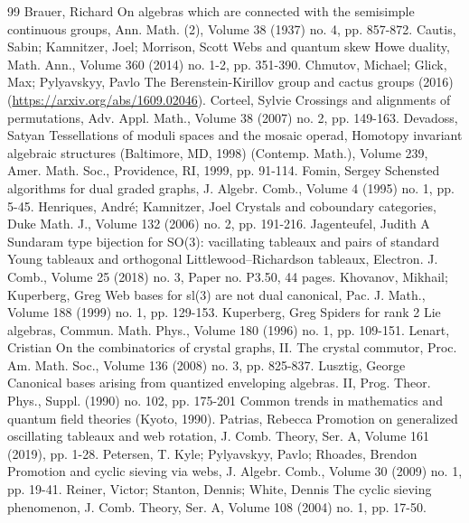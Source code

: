 \begin{thebibliography}{99}
 Brauer, Richard On algebras which are connected with the semisimple continuous groups, Ann. Math. (2), Volume 38 (1937) no. 4, pp. 857-872.
 Cautis, Sabin; Kamnitzer, Joel; Morrison, Scott Webs and quantum skew Howe duality, Math. Ann., Volume 360 (2014) no. 1-2, pp. 351-390.
 Chmutov, Michael; Glick, Max; Pylyavskyy, Pavlo The Berenstein-Kirillov group and cactus groups (2016) (\url{https://arxiv.org/abs/1609.02046}).
 Corteel, Sylvie Crossings and alignments of permutations, Adv. Appl. Math., Volume 38 (2007) no. 2, pp. 149-163.
 Devadoss, Satyan Tessellations of moduli spaces and the mosaic operad, Homotopy invariant algebraic structures (Baltimore, MD, 1998) (Contemp. Math.), Volume 239, Amer. Math. Soc., Providence, RI, 1999, pp. 91-114.
 Fomin, Sergey Schensted algorithms for dual graded graphs, J. Algebr. Comb., Volume 4 (1995) no. 1, pp. 5-45.
 Henriques, André; Kamnitzer, Joel Crystals and coboundary categories, Duke Math. J., Volume 132 (2006) no. 2, pp. 191-216.
 Jagenteufel, Judith A Sundaram type bijection for SO(3): vacillating tableaux and pairs of standard Young tableaux and orthogonal Littlewood–Richardson tableaux, Electron. J. Comb., Volume 25 (2018) no. 3, Paper no. P3.50, 44 pages.
 Khovanov, Mikhail; Kuperberg, Greg Web bases for sl(3) are not dual canonical, Pac. J. Math., Volume 188 (1999) no. 1, pp. 129-153.
 Kuperberg, Greg Spiders for rank 2 Lie algebras, Commun. Math. Phys., Volume 180 (1996) no. 1, pp. 109-151.
 Lenart, Cristian On the combinatorics of crystal graphs, II. The crystal commutor, Proc. Am. Math. Soc., Volume 136 (2008) no. 3, pp. 825-837.
 Lusztig, George Canonical bases arising from quantized enveloping algebras. II, Prog. Theor. Phys., Suppl. (1990) no. 102, pp. 175-201 Common trends in mathematics and quantum field theories (Kyoto, 1990).
 Patrias, Rebecca Promotion on generalized oscillating tableaux and web rotation, J. Comb. Theory, Ser. A, Volume 161 (2019), pp. 1-28.
 Petersen, T. Kyle; Pylyavskyy, Pavlo; Rhoades, Brendon Promotion and cyclic sieving via webs, J. Algebr. Comb., Volume 30 (2009) no. 1, pp. 19-41.
 Reiner, Victor; Stanton, Dennis; White, Dennis The cyclic sieving phenomenon, J. Comb. Theory, Ser. A, Volume 108 (2004) no. 1, pp. 17-50.

\end{thebibliography}
